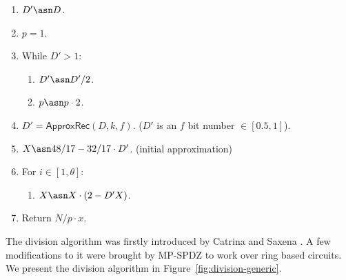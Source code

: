 \begin{enumerate}
  \item $D' \asn D$.
  \item $p = 1$.
  \item While $D' > 1$:
  \begin{enumerate}
    \item $D' \asn D' / 2$.
    \item $p \asn p \cdot 2$.
  \end{enumerate}

  \item $D' = \mathsf{ApproxRec}(D, k, f)$. ($D'$ is an $f$ bit number $\in [0.5, 1]$).
  \item $X \asn 48/17 - 32/17 \cdot D'$. (initial approximation)
  \item For $i \in [1, \theta]$:
  \begin{enumerate}
      \item $X \asn X \cdot (2 - D'X)$.
  \end{enumerate}
  \item Return $N / p \cdot x$.
\end{enumerate}


The division algorithm was firstly introduced by Catrina and Saxena \cite{FC:CatSax10}.
A few modifications to it were brought by MP-SPDZ to work over ring based circuits.
We present the division algorithm in Figure~\ref{fig:division-generic}.

